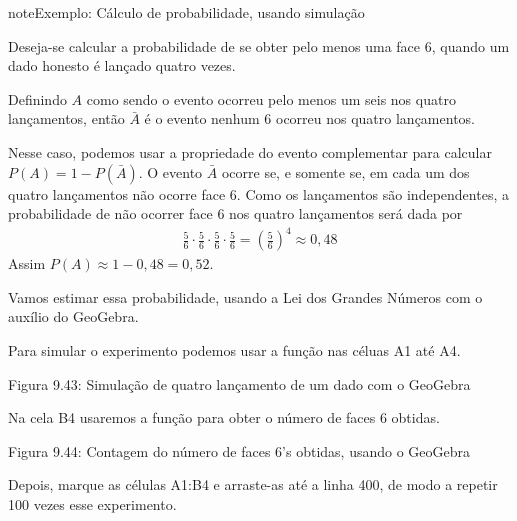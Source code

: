 \begin{sphinxadmonition}{note}{Exemplo: Cálculo de probabilidade, usando simulação}

Deseja-se calcular a probabilidade de se obter pelo menos uma face 6, quando um dado honesto é lançado quatro vezes.

Definindo \(A\) como sendo o evento ocorreu pelo menos um seis nos quatro lançamentos, então \(\bar{A}\) é o evento nenhum 6 ocorreu nos quatro lançamentos.

Nesse caso, podemos usar a propriedade do evento complementar para calcular \(P(A)=1-P(\bar{A})\).
O evento \(\bar{A}\)  ocorre se, e somente se, em cada um dos quatro lançamentos não ocorre face 6. Como os lançamentos são independentes, a probabilidade de não ocorrer face 6 nos quatro lançamentos será dada por
\begin{equation*}
\begin{split}\frac{5}{6}\cdot \frac{5}{6}\cdot \frac{5}{6}\cdot \frac{5}{6}=\left (\frac{5}{6}\right )^4\approx 0,48\end{split}
\end{equation*}
Assim \(P(A) \approx 1- 0,48=0,52\).

Vamos estimar essa probabilidade, usando a Lei dos Grandes Números com o auxílio do GeoGebra.

Para simular o experimento podemos usar a função  nas céluas A1 até A4.
\label{\detokenize{PE511-A:id7}}
\begin{figure}[H]
\centering

\noindent{}
\label{\detokenize{PE511-A:id7}}\end{figure}

Figura 9.43: Simulação de quatro lançamento de um dado com o GeoGebra

Na cela B4 usaremos a função  para obter o número de faces 6 obtidas.
\label{\detokenize{PE511-A:id8}}
\begin{figure}[H]
\centering

\noindent{}
\label{\detokenize{PE511-A:id8}}\end{figure}

Figura 9.44: Contagem do número de faces 6’s obtidas, usando o GeoGebra

Depois, marque as células A1:B4 e arraste-as até a linha 400, de modo a repetir 100 vezes esse experimento.
\label{\detokenize{PE511-A:id9}}
\begin{figure}[H]
\centering


\end{figure}
\end{sphinxadmonition}
